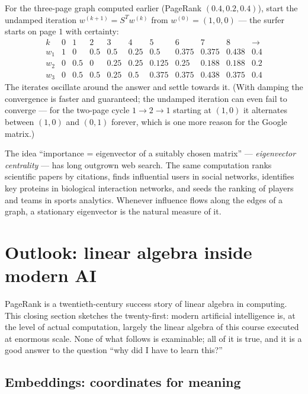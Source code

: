 \begin{example}
For the three-page graph computed earlier (PageRank $(0.4, 0.2, 0.4)$), start the undamped iteration
$w^{(k+1)} = S^T w^{(k)}$ from $w^{(0)} = (1,0,0)$ — the surfer starts on page $1$ with certainty:
\[
\begin{array}{c|ccccccccc|c}
k & 0 & 1 & 2 & 3 & 4 & 5 & 6 & 7 & 8 & \to\\
\hline
w_1 & 1 & 0 & 0.5 & 0.5 & 0.25 & 0.5 & 0.375 & 0.375 & 0.438 & 0.4\\
w_2 & 0 & 0.5 & 0 & 0.25 & 0.25 & 0.125 & 0.25 & 0.188 & 0.188 & 0.2\\
w_3 & 0 & 0.5 & 0.5 & 0.25 & 0.5 & 0.375 & 0.375 & 0.438 & 0.375 & 0.4
\end{array}
\]
The iterates oscillate around the answer and settle towards it. (With damping the convergence is faster
and guaranteed; the undamped iteration can even fail to converge — for the two-page cycle $1\to 2\to 1$
starting at $(1,0)$ it alternates between $(1,0)$ and $(0,1)$ forever, which is one more reason for the
Google matrix.)
\end{example}

\begin{remark}
The idea ``importance = eigenvector of a suitably chosen matrix'' — \emph{eigenvector centrality} — has
long outgrown web search. The same computation ranks scientific papers by citations, finds influential
users in social networks, identifies key proteins in biological interaction networks, and seeds the
ranking of players and teams in sports analytics. Whenever influence flows along the edges of a graph, a
stationary eigenvector is the natural measure of it.
\end{remark}

\section{Outlook: linear algebra inside modern AI}\label{sec:ai}

PageRank is a twentieth-century success story of linear algebra in computing. This closing section
sketches the twenty-first: modern artificial intelligence is, at the level of actual computation, largely
the linear algebra of this course executed at enormous scale. None of what follows is examinable; all of
it is true, and it is a good answer to the question ``why did I have to learn this?''

\subsection{Embeddings: coordinates for meaning}

